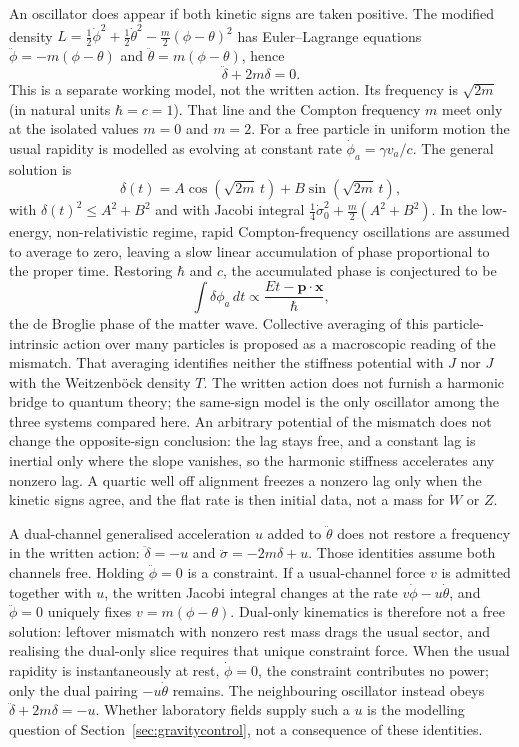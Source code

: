 \documentclass[a4paper]{article}
\begin{document}
An oscillator does appear if both kinetic signs are taken positive. The modified density $L=\tfrac12\dot\phi^2+\tfrac12\dot\theta^2-\tfrac m2(\phi-\theta)^2$ has Euler--Lagrange equations $\ddot\phi=-m(\phi-\theta)$ and $\ddot\theta=m(\phi-\theta)$, hence
\[
\ddot\delta+2m\delta=0.
\]
This is a separate working model, not the written action. Its frequency is $\sqrt{2m}$ (in natural units $\hbar=c=1$). That line and the Compton frequency $m$ meet only at the isolated values $m=0$ and $m=2$. For a free particle in uniform motion the usual rapidity is modelled as evolving at constant rate $\dot{\phi}_a=\gamma v_a/c$. The general solution is
\[
\delta(t)=A\cos(\sqrt{2m}\,t)+B\sin(\sqrt{2m}\,t),
\]
with $\delta(t)^2\le A^2+B^2$ and with Jacobi integral $\tfrac14\dot\sigma_0^2+\tfrac m2(A^2+B^2)$.
In the low-energy, non-relativistic regime, rapid Compton-frequency oscillations are assumed to average to zero, leaving a slow linear accumulation of phase proportional to the proper time. Restoring $\hbar$ and $c$, the accumulated phase is conjectured to be
\[
\int \delta\phi_a \, dt \propto \frac{E t - \mathbf{p} \cdot \mathbf{x}}{\hbar},
\]
the de Broglie phase of the matter wave. Collective averaging of this particle-intrinsic action over many particles is proposed as a macroscopic reading of the mismatch. That averaging identifies neither the stiffness potential with $J$ nor $J$ with the Weitzenb\"ock density $T$. The written action does not furnish a harmonic bridge to quantum theory; the same-sign model is the only oscillator among the three systems compared here. An arbitrary potential of the mismatch does not change the opposite-sign conclusion: the lag stays free, and a constant lag is inertial only where the slope vanishes, so the harmonic stiffness accelerates any nonzero lag. A quartic well off alignment freezes a nonzero lag only when the kinetic signs agree, and the flat rate is then initial data, not a mass for $W$ or $Z$.

A dual-channel generalised acceleration $u$ added to $\ddot\theta$ does not restore a frequency in the written action: $\ddot\delta=-u$ and $\ddot\sigma=-2m\delta+u$. Those identities assume both channels free. Holding $\ddot\phi=0$ is a constraint. If a usual-channel force $v$ is admitted together with $u$, the written Jacobi integral changes at the rate $v\dot\phi-u\dot\theta$, and $\ddot\phi=0$ uniquely fixes $v=m(\phi-\theta)$. Dual-only kinematics is therefore not a free solution: leftover mismatch with nonzero rest mass drags the usual sector, and realising the dual-only slice requires that unique constraint force. When the usual rapidity is instantaneously at rest, $\dot\phi=0$, the constraint contributes no power; only the dual pairing $-u\dot\theta$ remains. The neighbouring oscillator instead obeys $\ddot\delta+2m\delta=-u$. Whether laboratory fields supply such a $u$ is the modelling question of Section~\ref{sec:gravitycontrol}, not a consequence of these identities.
\end{document}

